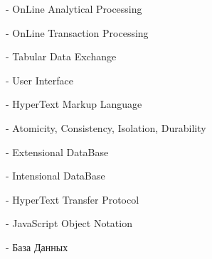 \label{sec:terms}

\olap\xspace - OnLine Analytical Processing

\oltp\xspace - OnLine Transaction Processing

\tdx\xspace - Tabular Data Exchange

\ui\xspace - User Interface

\html\xspace - HyperText Markup Language

\acid\xspace - Atomicity, Consistency, Isolation, Durability

\edb\xspace - Extensional DataBase

\idb\xspace - Intensional DataBase

\http\xspace - HyperText Transfer Protocol

\json\xspace - JavaScript Object Notation

\dbr\xspace - База Данных
